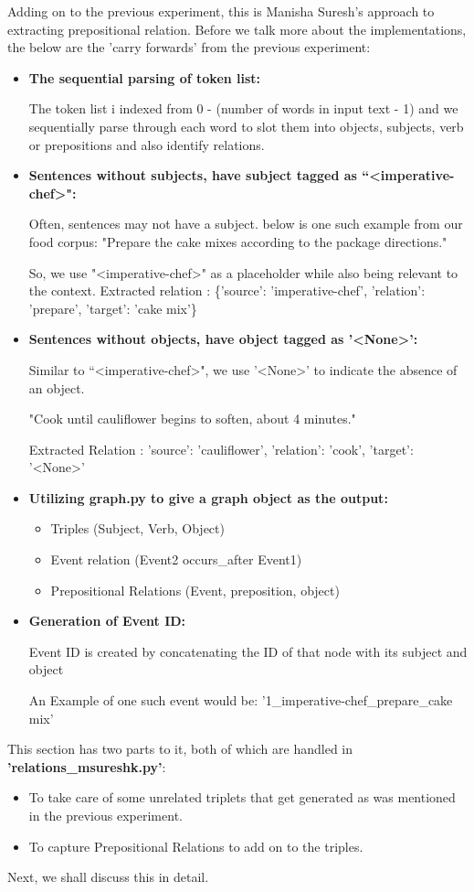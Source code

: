 \documentclass[11pt,letterpaper]{article}
\begin{document}
Adding on to the previous experiment, this is Manisha Suresh's approach to extracting prepositional relation. Before we talk more about the implementations, the below are the 'carry forwards' from the previous experiment:
\begin{itemize}
    \item \textbf{The sequential parsing of token list:}
    
    The token list i indexed from 0 - (number of words in input text - 1) and we sequentially parse through each word to slot them into objects, subjects, verb or prepositions and also identify relations.
    
    \item \textbf{Sentences without subjects, have subject tagged as “<imperative-chef>":}
    
    Often, sentences may not have a subject. below is one such example from our food corpus:
    "Prepare the cake mixes according to the package directions."
    
    So, we use "<imperative-chef>" as a placeholder while also being relevant to the context.
    Extracted relation : \{'source': 'imperative-chef', 'relation': 'prepare', 'target': 'cake mix'\}
    
    \item \textbf{Sentences without objects, have object tagged as ’<None>’:}
    
    Similar to “<imperative-chef>", we use ’<None>’ to indicate the absence of an object.
    
    "Cook until cauliflower begins to soften, about 4 minutes."
    
    Extracted Relation : {'source': 'cauliflower', 'relation': 'cook', 'target': '<None>'}
    
    \item \textbf{Utilizing graph.py to give a graph object as the output:}
    
    \begin{itemize}
        \item Triples (Subject, Verb, Object)
        \item Event relation (Event2 occurs\_after Event1)
        \item Prepositional Relations (Event, preposition, object)
    \end{itemize}
     \item \textbf{Generation of Event ID:}
     
      Event ID is created by concatenating the ID of that node with its subject and object
      
      An Example of one such event would be: '1\_imperative-chef\_prepare\_cake mix'
\end{itemize}
This section has two parts to it, both of which are handled in \textbf{'relations\_msureshk.py'}:
\begin{itemize}
    \item To take care of some unrelated triplets that get generated as was mentioned in the previous experiment.
    \item To capture Prepositional Relations to add on to the triples.
\end{itemize}
Next, we shall discuss this in detail.
\end{document}
